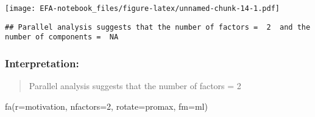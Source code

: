 \documentclass[
]{article}
\newenvironment{Shaded}{\begin{snugshade}}{\end{snugshade}}
\newcommand{\AttributeTok}[1]{\textcolor[rgb]{0.77,0.63,0.00}{#1}}
\newcommand{\DecValTok}[1]{\textcolor[rgb]{0.00,0.00,0.81}{#1}}
\newcommand{\FunctionTok}[1]{\textcolor[rgb]{0.00,0.00,0.00}{#1}}
\newcommand{\NormalTok}[1]{#1}
\newcommand{\StringTok}[1]{\textcolor[rgb]{0.31,0.60,0.02}{#1}}
\begin{document}
\texttt{[image: EFA-notebook\_files/figure-latex/unnamed-chunk-14-1.pdf]}

\begin{verbatim}
## Parallel analysis suggests that the number of factors =  2  and the number of components =  NA
\end{verbatim}

\hypertarget{interpretation-9}{%
\subsubsection{Interpretation:}\label{interpretation-9}}

\begin{quote}
Parallel analysis suggests that the number of factors = 2
\end{quote}

\begin{Shaded}
\begin{Highlighting}[]
\FunctionTok{fa}\NormalTok{(}\AttributeTok{r=}\NormalTok{motivation, }\AttributeTok{nfactors=}\DecValTok{2}\NormalTok{, }\AttributeTok{rotate=}\StringTok{\textquotesingle{}promax\textquotesingle{}}\NormalTok{, }\AttributeTok{fm=}\StringTok{\textquotesingle{}ml\textquotesingle{}}\NormalTok{)}
\end{Highlighting}
\end{Shaded}
\end{document}
